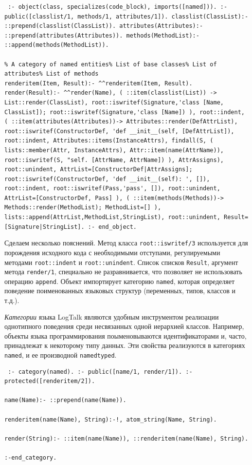 \documentclass[conference]{IEEEtran} \IEEEoverridecommandlockouts
\begin{document}
\begin{verbatim} :- object(class, specializes(code_block), imports([named])). :- public([classlist/1, methods/1, attributes/1]). classlist(ClassList):- ::prepend(classlist(ClassList)). attributes(Attributes):- ::prepend(attributes(Attributes)). methods(MethodList):- ::append(methods(MethodList)). 

% A category of named entities% List of base classes% List of attributes% List of methods
renderitem(Item, Result):- ^^renderitem(Item, Result). render(Result):- ^^render(Name), ( ::item(classlist(List)) -> List::render(ClassList), root::iswritef(Signature,'class [Name, ClassList]); root::iswritef(Signature,'class [Name]) ), root::indent, ( ::item(attributes(Attributes))-> Attributes::render(DefAttrList), root::iswritef(ConstructorDef, 'def __init__(self, [DefAttrList]), root::indent, Attributes::items(InstanceAttrs), findall(S, ( lists::member(Attr, InstanceAttrs), Attr::item(name(AttrName)), root::iswritef(S, "self. [AttrName, AttrName]) ), AttrAssigns), root::unindent, AttrList=[ConstructorDef|AttrAssigns]; root::iswritef(ConstructorDef, 'def __init__(self): ', []), root::indent, root::iswritef(Pass,'pass', []), root::unindent, AttrList=[ConstructorDef, Pass] ), ( ::item(methods(Methods))-> Methods::render(MethodList); MethodList=[] ), lists::append(AttrList,MethodList,StringList), root::unindent, Result=[Signature|StringList]. :- end_object. \end{verbatim} 

Сделаем несколько пояснений. Метод класса \verb|root::iswritef/3| используется для порождения исходного кода с необходимыми отступами, регулируемыми методами \verb|root::indent| и \verb|root::unindent|. Список списков \verb|Result|, аргумент метода \verb|render/1|, специально не разравнивается, что позволяет не использовать операцию \verb|append|. Объект импортирует категорию \verb|named|, которая определяет поведение поименованных языковых структур (переменных, типов, классов и т.д.). 

\emph{Категории} языка LogTalk являются удобным инструментом реализации однотипного поведения среди несвязанных одной иерархией классов. Например, объекты языка программирования поыменовываются идентификаторами и, часто, принадлежат к некоторому типу данных. Эти свойства реализуются в категориях \texttt{named}, и ее производной \texttt{namedtyped}. \begin{verbatim} :- category(named). :- public([name/1, render/1]). :- protected([renderitem/2]). 

name(Name):- ::prepend(name(Name)). 

renderitem(name(Name), String):-!, atom_string(Name, String). 

render(String):- ::item(name(Name)), ::renderitem(name(Name), String). 

:-end_category. \end{verbatim} 
\end{document}
